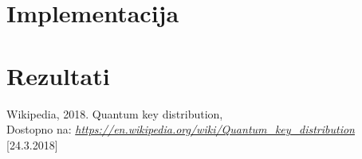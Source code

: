 \documentclass[A4paper, 11pt]{article}
\begin{document}

\section{Implementacija}


\section{Rezultati} 




\begin{thebibliography}{9}
	Wikipedia, 2018. Quantum key distribution,  \\
	Dostopno na:
	\textit{\url{https://en.wikipedia.org/wiki/Quantum_key_distribution}}
	[24.3.2018]
\end{thebibliography}
\end{document}
